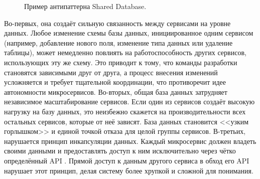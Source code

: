 \begin{figure}[ht]
   \centering
   
   \caption{\label{shared-database} Пример антипаттерна Shared Database.}
\end{figure}

Во-первых, она создаёт сильную связанность между сервисами на уровне данных. Любое изменение схемы базы данных, инициированное одним сервисом (например, добавление нового поля, изменение типа данных или удаление таблицы), может немедленно повлиять на работоспособность других сервисов, использующих эту же схему. Это приводит к тому, что команды разработки становятся зависимыми друг от друга, а процесс внесения изменений усложняется и требует тщательной координации, что противоречит идее автономности микросервисов.
Во-вторых, общая база данных затрудняет независимое масштабирование сервисов. Если один из сервисов создаёт высокую нагрузку на базу данных, это неизбежно скажется на производительности всех остальных сервисов, которые от неё зависят. База данных становится <<узким горлышком>> и единой точкой отказа для целой группы сервисов.
В-третьих, нарушается принцип инкапсуляции данных. Каждый микросервис должен владеть своими данными и предоставлять доступ к ним исключительно через чётко определённый API \cite{data-encapsulation-msa}. Прямой доступ к данным другого сервиса в обход его API нарушает этот принцип, делая систему более хрупкой и сложной для понимания.



